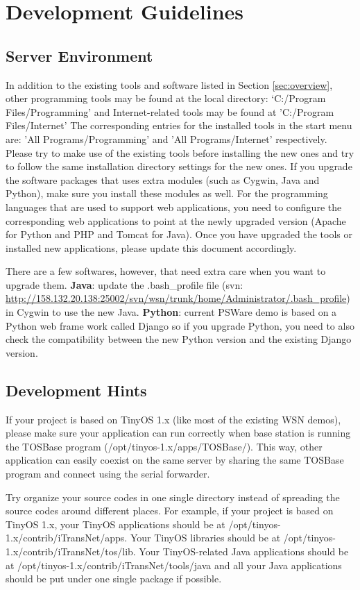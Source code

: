 \section{Development Guidelines}
\subsection{Server Environment}
\label{sec:environment}
In addition to the existing tools and software listed in Section \ref{sec:overview}, other programming tools may be found at the local directory: `C:/Program Files/Programming' and Internet-related tools may be found at 'C:/Program Files/Internet'
The corresponding entries for the installed tools in the start menu are: 'All Programs/Programming' and 'All Programs/Internet' respectively. Please try to make use of the existing tools before installing the new ones and try to follow the same installation directory settings for the new ones. If you upgrade the software packages that uses extra modules (such as Cygwin, Java and Python), make sure you install these modules as well. For the programming languages that are used to support web applications, you need to configure the corresponding web applications to point at the newly upgraded version (Apache for Python and PHP and Tomcat for Java). Once you have upgraded the tools or installed new applications, please update this document accordingly.

There are a few softwares, however, that need extra care when you want to upgrade them. \textbf{Java}: update the .bash\_profile file (svn: \url{http://158.132.20.138:25002/svn/wsn/trunk/home/Administrator/.bash_profile}) in Cygwin to use the new Java. \textbf{Python}: current PSWare demo is based on a Python web frame work called Django so if you upgrade Python, you need to also check the compatibility between the new Python version and the existing Django version.

\subsection{Development Hints}
\label{sec:hints}
If your project is based on TinyOS 1.x (like most of the existing WSN demos), please make sure your application can run correctly when base station is running the TOSBase program (/opt/tinyos-1.x/apps/TOSBase/). This way, other application can easily coexist on the same server by sharing the same TOSBase program and connect using the serial forwarder.

Try organize your source codes in one single directory instead of spreading the source codes around different places. For example, if your project is based on TinyOS 1.x, your TinyOS applications should be at /opt/tinyos-1.x/contrib/iTransNet/apps. Your TinyOS libraries should be at /opt/tinyos-1.x/contrib/iTransNet/tos/lib. Your TinyOS-related Java applications should be at /opt/tinyos-1.x/contrib/iTransNet/tools/java and all your Java applications should be put under one single package if possible.

